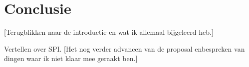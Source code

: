 \chapter*{Conclusie}

[Terugblikken naar de introductie en wat ik allemaal bijgeleerd heb.]

Vertellen over SPI.
[Het nog verder advancen van de proposal enbespreken van dingen waar ik niet klaar mee geraakt ben.]
